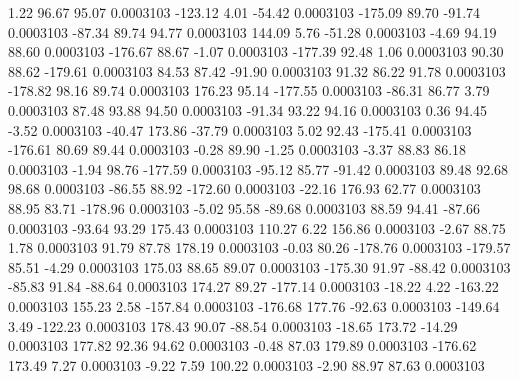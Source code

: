         1.22       96.67       95.07     0.0003103
     -123.12        4.01      -54.42     0.0003103
     -175.09       89.70      -91.74     0.0003103
      -87.34       89.74       94.77     0.0003103
      144.09        5.76      -51.28     0.0003103
       -4.69       94.19       88.60     0.0003103
     -176.67       88.67       -1.07     0.0003103
     -177.39       92.48        1.06     0.0003103
       90.30       88.62     -179.61     0.0003103
       84.53       87.42      -91.90     0.0003103
       91.32       86.22       91.78     0.0003103
     -178.82       98.16       89.74     0.0003103
      176.23       95.14     -177.55     0.0003103
      -86.31       86.77        3.79     0.0003103
       87.48       93.88       94.50     0.0003103
      -91.34       93.22       94.16     0.0003103
        0.36       94.45       -3.52     0.0003103
      -40.47      173.86      -37.79     0.0003103
        5.02       92.43     -175.41     0.0003103
     -176.61       80.69       89.44     0.0003103
       -0.28       89.90       -1.25     0.0003103
       -3.37       88.83       86.18     0.0003103
       -1.94       98.76     -177.59     0.0003103
      -95.12       85.77      -91.42     0.0003103
       89.48       92.68       98.68     0.0003103
      -86.55       88.92     -172.60     0.0003103
      -22.16      176.93       62.77     0.0003103
       88.95       83.71     -178.96     0.0003103
       -5.02       95.58      -89.68     0.0003103
       88.59       94.41      -87.66     0.0003103
      -93.64       93.29      175.43     0.0003103
      110.27        6.22      156.86     0.0003103
       -2.67       88.75        1.78     0.0003103
       91.79       87.78      178.19     0.0003103
       -0.03       80.26     -178.76     0.0003103
     -179.57       85.51       -4.29     0.0003103
      175.03       88.65       89.07     0.0003103
     -175.30       91.97      -88.42     0.0003103
      -85.83       91.84      -88.64     0.0003103
      174.27       89.27     -177.14     0.0003103
      -18.22        4.22     -163.22     0.0003103
      155.23        2.58     -157.84     0.0003103
     -176.68      177.76      -92.63     0.0003103
     -149.64        3.49     -122.23     0.0003103
      178.43       90.07      -88.54     0.0003103
      -18.65      173.72      -14.29     0.0003103
      177.82       92.36       94.62     0.0003103
       -0.48       87.03      179.89     0.0003103
     -176.62      173.49        7.27     0.0003103
       -9.22        7.59      100.22     0.0003103
       -2.90       88.97       87.63     0.0003103

